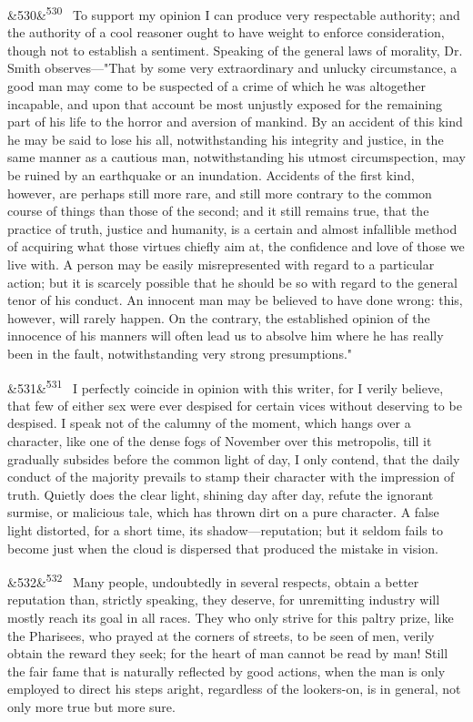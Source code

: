 \documentclass[12pt]{article}
\newcommand{\para}[1][]{\par\noindent\ifx&#1&\else\textsuperscript{\footnotesize #1}~\fi}
\begin{document}
\para[530] To support my opinion I can produce very respectable authority; and the authority of a cool reasoner ought to have weight to enforce consideration, though not to establish a sentiment. Speaking of the general laws of morality, Dr. Smith observes---"That by some very extraordinary and unlucky circumstance, a good man may come to be suspected of a crime of which he was altogether incapable, and upon that account be most unjustly exposed for the remaining part of his life to the horror and aversion of mankind. By an accident of this kind he may be said to lose his all, notwithstanding his integrity and justice, in the same manner as a cautious man, notwithstanding his utmost circumspection, may be ruined by an earthquake or an inundation. Accidents of the first kind, however, are perhaps still more rare, and still more contrary to the common course of things than those of the second; and it still remains true, that the practice of truth, justice and humanity, is a certain and almost infallible method of acquiring what those virtues chiefly aim at, the confidence and love of those we live with. A person may be easily misrepresented with regard to a particular action; but it is scarcely possible that he should be so with regard to the general tenor of his conduct. An innocent man may be believed to have done wrong: this, however, will rarely happen. On the contrary, the established opinion of the innocence of his manners will often lead us to absolve him where he has really been in the fault, notwithstanding very strong presumptions."

\para[531] I perfectly coincide in opinion with this writer, for I verily believe, that few of either sex were ever despised for certain vices without deserving to be despised. I speak not of the calumny of the moment, which hangs over a character, like one of the dense fogs of November over this metropolis, till it gradually subsides before the common light of day, I only contend, that the daily conduct of the majority prevails to stamp their character with the impression of truth. Quietly does the clear light, shining day after day, refute the ignorant surmise, or malicious tale, which has thrown dirt on a pure character. A false light distorted, for a short time, its shadow---reputation; but it seldom fails to become just when the cloud is dispersed that produced the mistake in vision.

\para[532] Many people, undoubtedly in several respects, obtain a better reputation than, strictly speaking, they deserve, for unremitting industry will mostly reach its goal in all races. They who only strive for this paltry prize, like the Pharisees, who prayed at the corners of streets, to be seen of men, verily obtain the reward they seek; for the heart of man cannot be read by man! Still the fair fame that is naturally reflected by good actions, when the man is only employed to direct his steps aright, regardless of the lookers-on, is in general, not only more true but more sure.
\end{document}
